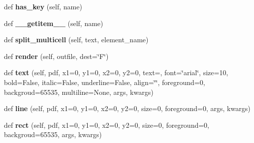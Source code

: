 \begin{DoxyCompactItemize}
\item 
def {\bfseries has\+\_\+key} (self, name)\hypertarget{class_libraries_1_1fpdf_1_1template_1_1_template_a89ca7ec011bb838f413a91b73bc3f630}{}\label{class_libraries_1_1fpdf_1_1template_1_1_template_a89ca7ec011bb838f413a91b73bc3f630}

\item 
def {\bfseries \+\_\+\+\_\+getitem\+\_\+\+\_\+} (self, name)\hypertarget{class_libraries_1_1fpdf_1_1template_1_1_template_ab551cf53210cd34431eb055aa8ce08e9}{}\label{class_libraries_1_1fpdf_1_1template_1_1_template_ab551cf53210cd34431eb055aa8ce08e9}

\item 
def {\bfseries split\+\_\+multicell} (self, text, element\+\_\+name)\hypertarget{class_libraries_1_1fpdf_1_1template_1_1_template_a6446f2031122e16292f89afcf8dbd1d5}{}\label{class_libraries_1_1fpdf_1_1template_1_1_template_a6446f2031122e16292f89afcf8dbd1d5}

\item 
def {\bfseries render} (self, outfile, dest=\char`\"{}F\char`\"{})\hypertarget{class_libraries_1_1fpdf_1_1template_1_1_template_afd2fdf24a1deb30eec5278dd313a3bd3}{}\label{class_libraries_1_1fpdf_1_1template_1_1_template_afd2fdf24a1deb30eec5278dd313a3bd3}

\item 
def {\bfseries text} (self, pdf, x1=0, y1=0, x2=0, y2=0, text=\textquotesingle{}\textquotesingle{}, font=\char`\"{}arial\char`\"{}, size=10, bold=False, italic=False, underline=False, align=\char`\"{}\char`\"{}, foreground=0, backgroud=65535, multiline=None, args, kwargs)\hypertarget{class_libraries_1_1fpdf_1_1template_1_1_template_a650ceae6da52f61f056024acde24b4fe}{}\label{class_libraries_1_1fpdf_1_1template_1_1_template_a650ceae6da52f61f056024acde24b4fe}

\item 
def {\bfseries line} (self, pdf, x1=0, y1=0, x2=0, y2=0, size=0, foreground=0, args, kwargs)\hypertarget{class_libraries_1_1fpdf_1_1template_1_1_template_aa7b3e582d31a1e889874c6aa907d103c}{}\label{class_libraries_1_1fpdf_1_1template_1_1_template_aa7b3e582d31a1e889874c6aa907d103c}

\item 
def {\bfseries rect} (self, pdf, x1=0, y1=0, x2=0, y2=0, size=0, foreground=0, backgroud=65535, args, kwargs)\hypertarget{class_libraries_1_1fpdf_1_1template_1_1_template_a8342460b18293a9852953895d6934cfc}{}\label{class_libraries_1_1fpdf_1_1template_1_1_template_a8342460b18293a9852953895d6934cfc}


\end{DoxyCompactItemize}
